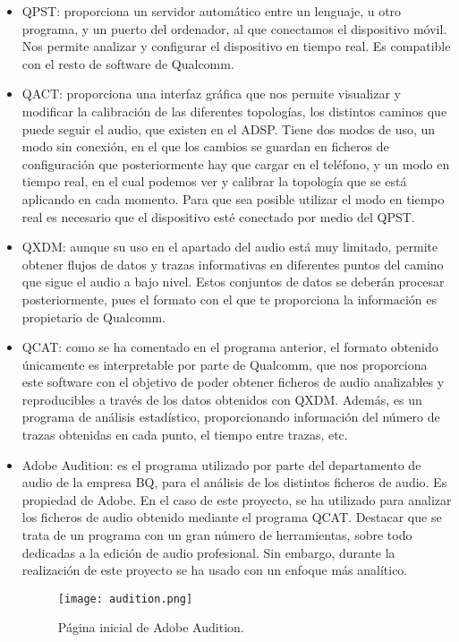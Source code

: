 \begin{itemize}
	\item{\gls{QPST}: proporciona un servidor automático entre un lenguaje, u otro programa, y un puerto del ordenador, al que conectamos el dispositivo móvil. Nos permite analizar y configurar el dispositivo en tiempo real. Es compatible con el resto de software de Qualcomm.}
	\item{\gls{QACT}: proporciona una interfaz gráfica que nos permite visualizar y modificar la calibración de las diferentes topologías, los distintos caminos que puede seguir el audio, que existen en el \gls{ADSP}. Tiene dos modos de uso, un modo sin conexión, en el que los cambios se guardan en ficheros de configuración que posteriormente hay que cargar en el teléfono, y un modo en tiempo real, en el cual podemos ver y calibrar la topología que se está aplicando en cada momento. Para que sea posible utilizar el modo en tiempo real es necesario que el dispositivo esté conectado por medio del \gls{QPST}.}	
	\item{\gls{QXDM}: aunque su uso en el apartado del audio está muy limitado, permite obtener flujos de datos y trazas informativas en diferentes puntos del camino que sigue el audio a bajo nivel. Estos conjuntos de datos se deberán procesar posteriormente, pues el formato con el que te proporciona la información es propietario de Qualcomm.}	
	\item{\gls{QCAT}: como se ha comentado en el programa anterior, el formato obtenido únicamente es interpretable por parte de Qualcomm, que nos proporciona este software con el objetivo de poder obtener ficheros de audio analizables y reproducibles a través de los datos obtenidos con \gls{QXDM}. Además, es un programa de análisis estadístico, proporcionando información del número de trazas obtenidas en cada punto, el tiempo entre trazas, etc.}	
	\item{Adobe Audition: es el programa utilizado por parte del departamento de audio de la empresa BQ, para el análisis de los distintos ficheros de audio. Es propiedad de Adobe. En el caso de este proyecto, se ha utilizado para analizar los ficheros de audio obtenido mediante el programa \gls{QCAT}. Destacar que se trata de un programa con un gran número de herramientas, sobre todo dedicadas a la edición de audio profesional. Sin embargo, durante la realización de este proyecto se ha usado con un enfoque más analítico.}
	\begin{figure}[H]
		\centering
		\texttt{[image: audition.png]}
		\caption{Página inicial de Adobe Audition.}

\end{figure}
\end{itemize}
